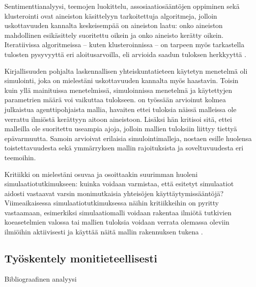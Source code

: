 \documentclass[finnish,gradu,twoside,12pt]{tktltiki}
\begin{document}
{Sentimenttianalyysi, teemojen luokittelu, assosiaatiosääntöjen oppiminen sekä klusterointi ovat aineiston käsittelyyn tarkoitettuja algoritmeja, jolloin uskottavuuden kannalta keskeisempää on aineiston laatu: onko aineiston mahdollinen esikäsittely suoritettu oikein ja onko aineisto kerätty oikein. Iteratiivissa algoritmeissa -- kuten klusteroinnissa -- on tarpeen myös tarkastella tulosten pysyvyyttä eri aloitusarvoilla, eli arvioida saadun tuloksen herkkyyttä .

Kirjallisuuden pohjalta laskennallisen yhteiskuntatieteen käytetyn menetelmä oli simulointi, joka on mielestäni uskottavuuden kannalta myös haastavin. Toisin kuin yllä mainituissa menetelmissä, simuloinnissa menetelmä ja käytettyjen parametrien määrä voi vaikuttaa tulokseen. \citet{bloomquist2006comparison} on työssään arvioinut kolmea julkaistua agenttipohjaista mallia, havaiten ettei tuloksia näissä malleissa ole verrattu ilmiöstä kerättyyn aitoon aineistoon. Lisäksi  hän kritisoi sitä, ettei malleilla ole suoritettu useampia ajoja, jolloin mallien tuloksiin liittyy tiettyä epävarmuutta. Samoin \citet{edmonds2005computational} arvioivat erilaisia simulointimalleja, nostaen esille huolensa toistettavuudesta sekä ymmärryksen mallin rajoituksista ja soveltuvuudesta eri teemoihin.

Kritiikki on mielestäni osuvaa ja osoittaakin suurimman huoleni simulaatiotutkimukseen: kuinka voidaan varmistaa, että esitetyt simulaatiot aidosti vastaavat varsin monimutkaisia yhteisöjen käyttäytymissääntöjä? Viimeaikaisessa simulaatiotutkimuksessa näihin kritiikkeihin on pyritty vastaamaan, esimerkiksi simulaatiomalli voidaan rakentaa ilmiötä tutkivien koeasetelmien valossa \citep{Villatoro2013} tai mallien tuloksia voidaan verrata olemassa oleviin ilmiöihin aktiivisesti ja käyttää näitä mallin rakennuksen tukena \citep{Pearson2011}.



\subsection{Työskentely monitieteellisesti}

Bibliograafinen analyysi

}
\end{document}
